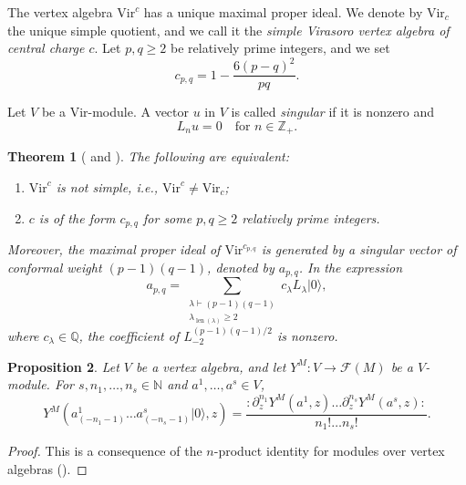 \documentclass[a4paper, 12pt, reqno]{amsart}
\newtheorem{theorem}{Theorem}[section]
\newtheorem{proposition}[theorem]{Proposition}
\theoremstyle{remark}
\DeclareMathOperator{\len}{len}
\newcommand{\vac}{{|0\rangle}}
\newcommand{\Vir}{{\mathrm{Vir}}}
\begin{document}
The vertex algebra $\Vir^c$ has a unique maximal proper ideal.
We denote by $\Vir_c$ the unique simple quotient, and we call it the \emph{simple Virasoro vertex algebra of central charge $c$}.
Let $p, q \ge 2$ be relatively prime integers, and we set
\begin{equation*}
  c_{p, q} = 1 - \frac{6(p - q)^2}{pq}.
\end{equation*}

Let $V$ be a $\Vir$-module.
A vector $u$ in $V$ is called \emph{singular} if it is nonzero and
\begin{equation*}
  L_nu = 0 \quad \text{for $n \in \mathbb{Z}_+$}.
\end{equation*}

\begin{theorem}[{\cite{feigin_verma_1984} and \cite{gorelik_simplicity_2007}}]
  \label{thr:4}
  The following are equivalent:
  \begin{enumerate}
  \item $\Vir^c$ is not simple, i.e., $\Vir^c \neq \Vir_c$;
  \item $c$ is of the form $c_{p, q}$ for some $p, q \ge 2$ relatively prime integers.
  \end{enumerate}
  Moreover, the maximal proper ideal of $\Vir^{c_{p, q}}$ is generated by a singular vector of conformal weight $(p - 1)(q - 1)$, denoted by $a_{p, q}$.
  In the expression
  \begin{equation*}
    a_{p, q} = \sum_{\substack{\lambda \vdash (p - 1)(q - 1) \\ \lambda_{\len(\lambda)} \ge 2}}c_\lambda L_\lambda\vac,
  \end{equation*}
  where $c_\lambda \in \mathbb{Q}$, the coefficient of $L_{-2}^{(p - 1)(q - 1)/2}$ is nonzero.
\end{theorem}

\begin{proposition}
  \label{prp:3}
  Let $V$ be a vertex algebra, and let $Y^M: V \to \mathcal{F}(M)$ be a $V$-module.
  For $s, n_1, \dots, n_s \in \mathbb{N}$ and $a^1, \dots, a^s \in V$,
  \begin{equation*}
    Y^M(a^1_{(-n_1 - 1)}\dots a^s_{(-n_s - 1)}\vac, z) = \frac{:\partial^{n_1}_zY^M(a^1, z)\dots\partial^{n_s}_zY^M(a^s, z):}{n_1!\dots n_s!}.
  \end{equation*}
\end{proposition}

\begin{proof}
  This is a consequence of the $n$-product identity for modules over vertex algebras (\cite[(5.2.16)]{lepowsky_introduction_2004}).
\end{proof}
\end{document}
